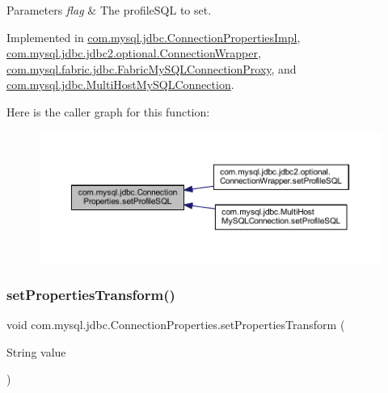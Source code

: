 \begin{DoxyParams}{Parameters}
{\em flag} & The profile\+S\+QL to set. \\
\hline
\end{DoxyParams}


Implemented in \mbox{\hyperlink{classcom_1_1mysql_1_1jdbc_1_1_connection_properties_impl_a117d473f1836b3b64201c0cf080afe05}{com.\+mysql.\+jdbc.\+Connection\+Properties\+Impl}}, \mbox{\hyperlink{classcom_1_1mysql_1_1jdbc_1_1jdbc2_1_1optional_1_1_connection_wrapper_a930d83fb622c7a5e5ac1694599e7b696}{com.\+mysql.\+jdbc.\+jdbc2.\+optional.\+Connection\+Wrapper}}, \mbox{\hyperlink{classcom_1_1mysql_1_1fabric_1_1jdbc_1_1_fabric_my_s_q_l_connection_proxy_ac272b0904665eb00016dcea93428e8f0}{com.\+mysql.\+fabric.\+jdbc.\+Fabric\+My\+S\+Q\+L\+Connection\+Proxy}}, and \mbox{\hyperlink{classcom_1_1mysql_1_1jdbc_1_1_multi_host_my_s_q_l_connection_a4cf77def253941b0c23f1ca26f9da972}{com.\+mysql.\+jdbc.\+Multi\+Host\+My\+S\+Q\+L\+Connection}}.

Here is the caller graph for this function\+:\nopagebreak
\begin{figure}[H]
\begin{center}
\leavevmode
\includegraphics[width=350pt]{interfacecom_1_1mysql_1_1jdbc_1_1_connection_properties_a6c91e5a3250a313eee67f7174599be99_icgraph}
\end{center}
\end{figure}
\mbox{\label{interfacecom_1_1mysql_1_1jdbc_1_1_connection_properties_a999fc9432437c9bf822f8e3ea6f03ce9}} 
\subsubsection{\texorpdfstring{set\+Properties\+Transform()}{setPropertiesTransform()}}
{\footnotesize\ttfamily void com.\+mysql.\+jdbc.\+Connection\+Properties.\+set\+Properties\+Transform (\begin{DoxyParamCaption}\item[{String}]{value }\end{DoxyParamCaption})}


